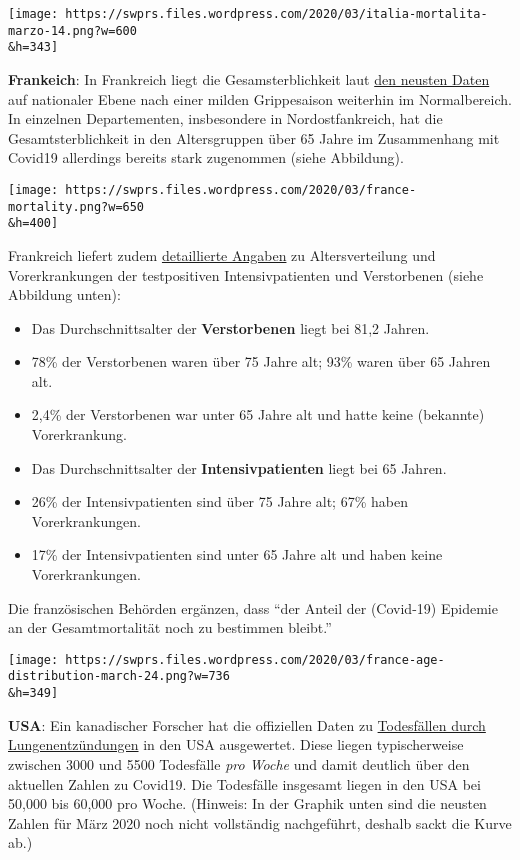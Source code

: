 \texttt{[image: https://swprs.files.wordpress.com/2020/03/italia-mortalita-marzo-14.png?w=600\\\&h=343]}

\textbf{Frankeich}: In Frankreich liegt die Gesamsterblichkeit laut
\href{https://www.santepubliquefrance.fr/maladies-et-traumatismes/maladies-et-infections-respiratoires/infection-a-coronavirus/documents/bulletin-national/covid-19-point-epidemiologique-du-24-mars-2020}{den
neusten Daten} auf nationaler Ebene nach einer milden Grippesaison
weiterhin im Normalbereich. In einzelnen Departementen, insbesondere in
Nordostfankreich, hat die Gesamtsterblichkeit in den Altersgruppen über
65 Jahre im Zusammenhang mit Covid19 allerdings bereits stark zugenommen
(siehe Abbildung).

\texttt{[image: https://swprs.files.wordpress.com/2020/03/france-mortality.png?w=650\\\&h=400]}

Frankreich liefert zudem
\href{https://www.santepubliquefrance.fr/maladies-et-traumatismes/maladies-et-infections-respiratoires/infection-a-coronavirus/documents/bulletin-national/covid-19-point-epidemiologique-du-24-mars-2020}{detaillierte
Angaben} zu Altersverteilung und Vorerkrankungen der testpositiven
Intensivpatienten und Verstorbenen (siehe Abbildung unten):

\begin{itemize}
\tightlist
\item
  Das Durchschnittsalter der \textbf{Verstorbenen} liegt bei 81,2
  Jahren.
\item
  78\% der Verstorbenen waren über 75 Jahre alt; 93\% waren über 65
  Jahren alt.
\item
  2,4\% der Verstorbenen war unter 65 Jahre alt und hatte keine
  (bekannte) Vorerkrankung.
\item
  Das Durchschnittsalter der \textbf{Intensivpatienten} liegt bei 65
  Jahren.
\item
  26\% der Intensivpatienten sind über 75 Jahre alt; 67\% haben
  Vorerkrankungen.
\item
  17\% der Intensivpatienten sind unter 65 Jahre alt und haben keine
  Vorerkrankungen.
\end{itemize}

Die französischen Behörden ergänzen, dass ``der Anteil der (Covid-19)
Epidemie an der Gesamtmortalität noch zu bestimmen bleibt.''

\texttt{[image: https://swprs.files.wordpress.com/2020/03/france-age-distribution-march-24.png?w=736\\\&h=349]}

\textbf{USA}: Ein kanadischer Forscher hat die offiziellen Daten zu
\href{https://gis.cdc.gov/grasp/fluview/mortality.html}{Todesfällen
durch Lungen­ent­zündungen} in den USA ausgewertet. Diese liegen
typischerweise zwischen 3000 und 5500 Todesfälle \emph{pro Woche} und
damit deutlich über den aktuellen Zahlen zu Covid19. Die Todesfälle
insgesamt liegen in den USA bei 50,000 bis 60,000 pro Woche. (Hinweis:
In der Graphik unten sind die neusten Zahlen für März 2020 noch nicht
vollständig nachgeführt, deshalb sackt die Kurve ab.)

